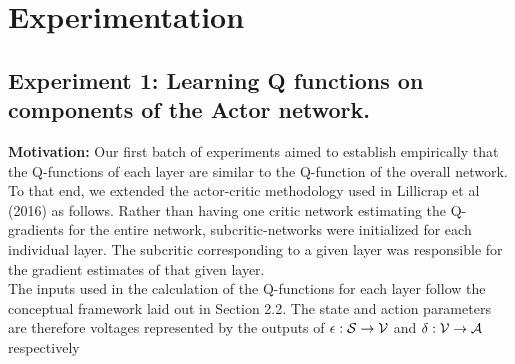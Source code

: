 \section{Experimentation}
\subsection{Experiment 1: Learning Q functions on components of the Actor network.}
\textbf{Motivation:} 
Our first batch of experiments aimed to establish empirically that the Q-functions of each layer are similar to the Q-function of the overall network. To that end, we extended the actor-critic methodology used in Lillicrap et al (2016) as follows. Rather than having one critic network estimating the Q-gradients for the entire network, subcritic-networks were initialized for each individual layer. The subcritic corresponding to a given layer was responsible for the gradient estimates of that given layer. \\
\newline
The inputs used in the calculation of the Q-functions for each layer follow the conceptual framework laid out in Section 2.2. The state and action parameters are therefore voltages represented by the outputs of $\epsilon : {\mathcal S} \to {\mathcal V}$ and $\delta : {\mathcal V} \to {\mathcal A}$ respectively